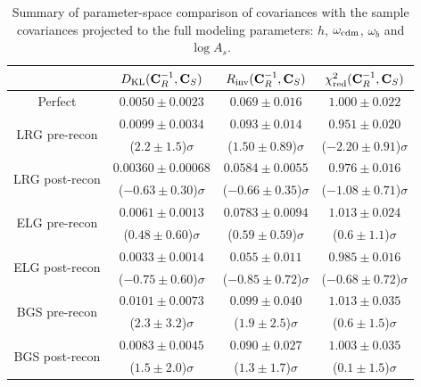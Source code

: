 \begin{table}[tb]
\centering
\begin{tabular}{|c|c|c|c|}
\hline
 & $D_{\rm KL} ({\bf C}_R^{-1}, {\bf C}_S)$ & $R_{\rm inv} ({\bf C}_R^{-1}, {\bf C}_S)$ & $\chi^2_{\rm red} ({\bf C}_R^{-1}, {\bf C}_S)$ \\
\hline
Perfect & $0.0050 \pm 0.0023$ & $0.069 \pm 0.016$ & $1.000 \pm 0.022$ \\
\hline
\multirow{2}{*}{LRG pre-recon} & $0.0099 \pm 0.0034$ & $0.093 \pm 0.014$ & $0.951 \pm 0.020$ \\
 & ($2.2 \pm 1.5$)$\sigma$ & ($1.50 \pm 0.89$)$\sigma$ & ($-2.20 \pm 0.91$)$\sigma$ \\
\hline
\multirow{2}{*}{LRG post-recon} & $0.00360 \pm 0.00068$ & $0.0584 \pm 0.0055$ & $0.976 \pm 0.016$ \\
 & ($-0.63 \pm 0.30$)$\sigma$ & ($-0.66 \pm 0.35$)$\sigma$ & ($-1.08 \pm 0.71$)$\sigma$ \\
\hline
\multirow{2}{*}{ELG pre-recon} & $0.0061 \pm 0.0013$ & $0.0783 \pm 0.0094$ & $1.013 \pm 0.024$ \\
 & ($0.48 \pm 0.60$)$\sigma$ & ($0.59 \pm 0.59$)$\sigma$ & ($0.6 \pm 1.1$)$\sigma$ \\
\hline
\multirow{2}{*}{ELG post-recon} & $0.0033 \pm 0.0014$ & $0.055 \pm 0.011$ & $0.985 \pm 0.016$ \\
 & ($-0.75 \pm 0.60$)$\sigma$ & ($-0.85 \pm 0.72$)$\sigma$ & ($-0.68 \pm 0.72$)$\sigma$ \\
\hline
\multirow{2}{*}{BGS pre-recon} & $0.0101 \pm 0.0073$ & $0.099 \pm 0.040$ & $1.013 \pm 0.035$ \\
 & ($2.3 \pm 3.2$)$\sigma$ & ($1.9 \pm 2.5$)$\sigma$ & ($0.6 \pm 1.5$)$\sigma$ \\
\hline
\multirow{2}{*}{BGS post-recon} & $0.0083 \pm 0.0045$ & $0.090 \pm 0.027$ & $1.003 \pm 0.035$ \\
 & ($1.5 \pm 2.0$)$\sigma$ & ($1.3 \pm 1.7$)$\sigma$ & ($0.1 \pm 1.5$)$\sigma$ \\
\hline
\end{tabular}
\caption[Parameter-space comparison of \rascalc{} covariances with the \desimock{} sample covariances projected to the full modeling parameters]{Summary of parameter-space comparison of \rascalc{} covariances with the sample covariances projected to the full modeling parameters: $h$, $\omega_{\rm cdm}$, $\omega_b$ and $\log A_s$.}
\label{tab:cov-comparison-direct-fit-parameters}
\end{table}

